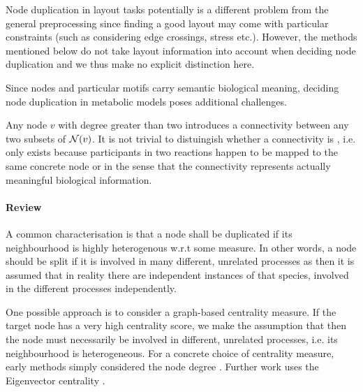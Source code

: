 \documentclass[
	fontsize=10pt, %
	twoside=false, %
	secnumdepth=1, %
  toc=indentunnumbered %
]{kaobook}
\begin{document}
Node duplication in layout tasks potentially is a different problem from the
general preprocessing since finding a good layout may come with particular
constraints (such as considering edge crossings, stress etc.). However, the
methods mentioned below do not take layout information into account when
deciding node duplication and we thus make no explicit distinction here.

Since nodes and particular motifs carry semantic biological meaning, deciding
node duplication in metabolic models poses additional challenges.

Any node $v$ with degree greater than two introduces a connectivity between any
two subsets of $\mathcal{N}(v)$. It is not trivial to distuingish whether a
connectivity is , i.e. only exists because participants in two reactions
happen to be mapped to the same concrete node
or  in the sense that the connectivity represents actually meaningful
biological information.


\paragraph{Review} A common characterisation is that a node shall be duplicated if its
neighbourhood is highly heterogenous w.r.t some measure. In other words, a
node should be split if it is involved in many different, unrelated processes
as then it is assumed that in reality there are independent instances of that
species, involved in the different processes independently.

One possible approach is to consider a graph-based centrality measure. If the
target node has a very high centrality score, we make the assumption that then
the node must necessarily be involved in different, unrelated processes, i.e.
its neighbourhood is heterogeneous. For a concrete choice of centrality measure,
early methods simply considered the node degree
\cite{ma_ReconstructionMetabolicNetworks_2003} \cite{schuster_exploring_2002}.
Further work uses the Eigenvector centrality \cite{manipur_clustering_2020}.
\end{document}
